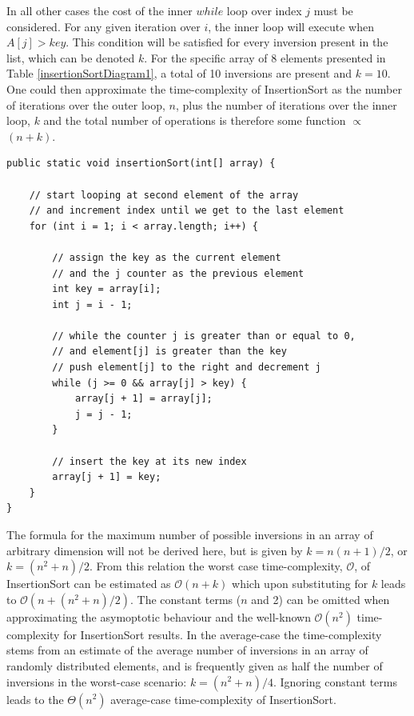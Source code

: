 \documentclass[12pt,a4paper]{article}
\begin{document}
In all other cases the cost of the inner $while$ loop over index $j$ must be considered. For any given iteration over $i$, the inner loop will execute when $A[j] > key$. This condition will be satisfied for every inversion present in the list, which can be denoted $k$. For the specific array of 8 elements presented in Table \ref{insertionSortDiagram1}, a total of 10 inversions are present and $k = 10$. One could then approximate the time-complexity of InsertionSort as the number of iterations over the outer loop, $n$, plus the number of iterations over the inner loop, $k$ and the total number of operations is therefore some function $\propto$ $(n+k)$.

\begin{lstlisting}[caption={InsertionSort algorithm adadapted from \cite{heineman_algorithms_2009} and implemented in the current project.},captionpos=b, label={insertionSortSource}]
public static void insertionSort(int[] array) {

	// start looping at second element of the array
	// and increment index until we get to the last element
	for (int i = 1; i < array.length; i++) {

		// assign the key as the current element
		// and the j counter as the previous element
		int key = array[i];
		int j = i - 1;

		// while the counter j is greater than or equal to 0,
		// and element[j] is greater than the key
		// push element[j] to the right and decrement j
		while (j >= 0 && array[j] > key) {
			array[j + 1] = array[j];
			j = j - 1;
		}

		// insert the key at its new index
		array[j + 1] = key;
	}
}
\end{lstlisting}



The formula for the maximum number of possible inversions in an array of arbitrary dimension will not be derived here, but is given by $k = n(n+1)/2$, or $k = (n^2+n)/2$. From this relation the worst case time-complexity, $\mathcal{O}$, of InsertionSort can be estimated as $\mathcal{O}(n+k)$ which upon substituting for $k$ leads to $\mathcal{O}(n+(n^2+n)/2)$. The constant terms ($n$ and 2) can be omitted when approximating the asymoptotic behaviour and the well-known $\mathcal{O}(n^2)$ time-complexity for InsertionSort results. In the average-case the time-complexity stems from an estimate of the average number of inversions in an array of randomly distributed elements, and is frequently given as half the number of inversions in the worst-case scenario: $k = (n^2+n)/4$. Ignoring constant terms leads to the $\Theta(n^2)$ average-case time-complexity of InsertionSort.
\end{document}
